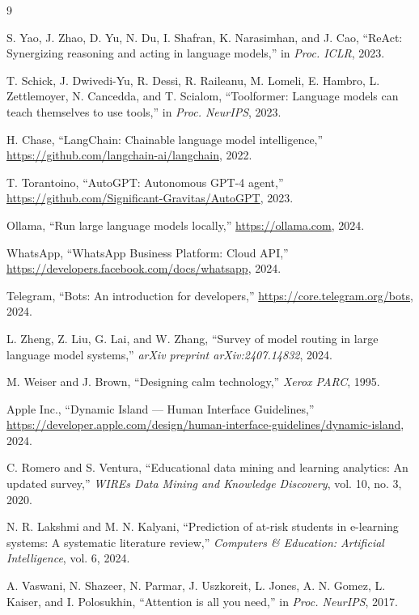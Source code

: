 \documentclass[conference]{IEEEtran}
\begin{document}
\begin{thebibliography}{9}

 S. Yao, J. Zhao, D. Yu, N. Du, I. Shafran,
K. Narasimhan, and J. Cao, ``ReAct: Synergizing reasoning and
acting in language models,'' in \emph{Proc. ICLR}, 2023.

 T. Schick, J. Dwivedi-Yu, R. Dessi, R. Raileanu,
M. Lomeli, E. Hambro, L. Zettlemoyer, N. Cancedda, and
T. Scialom, ``Toolformer: Language models can teach themselves to
use tools,'' in \emph{Proc. NeurIPS}, 2023.

 H. Chase, ``LangChain: Chainable language
model intelligence,'' \url{https://github.com/langchain-ai/langchain}, 2022.

 T. Torantoino, ``AutoGPT: Autonomous GPT-4
agent,'' \url{https://github.com/Significant-Gravitas/AutoGPT}, 2023.

 Ollama, ``Run large language models locally,''
\url{https://ollama.com}, 2024.

 WhatsApp, ``WhatsApp Business Platform:
Cloud API,'' \url{https://developers.facebook.com/docs/whatsapp}, 2024.

 Telegram, ``Bots: An introduction for
developers,'' \url{https://core.telegram.org/bots}, 2024.

 L. Zheng, Z. Liu, G. Lai, and W. Zhang,
``Survey of model routing in large language model systems,''
\emph{arXiv preprint arXiv:2407.14832}, 2024.

 M. Weiser and J. Brown, ``Designing calm
technology,'' \emph{Xerox PARC}, 1995.

 Apple Inc., ``Dynamic Island --- Human Interface
Guidelines,'' \url{https://developer.apple.com/design/human-interface-guidelines/dynamic-island}, 2024.

 C. Romero and S. Ventura, ``Educational data
mining and learning analytics: An updated survey,'' \emph{WIREs
Data Mining and Knowledge Discovery}, vol. 10, no. 3, 2020.

 N. R. Lakshmi and M. N. Kalyani, ``Prediction
of at-risk students in e-learning systems: A systematic
literature review,'' \emph{Computers \& Education: Artificial
Intelligence}, vol. 6, 2024.

 A. Vaswani, N. Shazeer, N. Parmar,
J. Uszkoreit, L. Jones, A. N. Gomez, L. Kaiser, and
I. Polosukhin, ``Attention is all you need,'' in \emph{Proc.
NeurIPS}, 2017.


\end{thebibliography}
\end{document}
